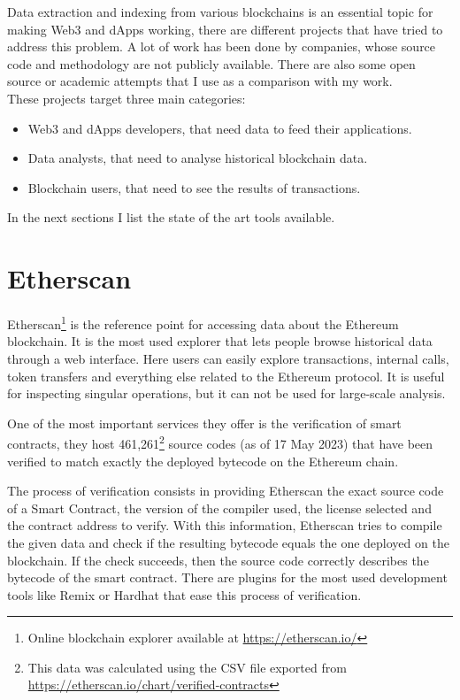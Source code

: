 
Data extraction and indexing from various blockchains is an essential topic for making Web3 and dApps working, there are different projects that have tried to address this problem. A lot of work has been done by companies, whose source code and methodology are not publicly available. There are also some open source or academic attempts that I use as a comparison with my work. \\

\noindent These projects target three main categories:

\begin{itemize}
  \item Web3 and dApps developers, that need data to feed their applications.
  \item Data analysts, that need to analyse historical blockchain data. 
  \item Blockchain users, that need to see the results of transactions.
\end{itemize}

\noindent In the next sections I list the state of the art tools available.

\section{Etherscan}

Etherscan\footnote{Online blockchain explorer available at \url{https://etherscan.io/}} is the reference point for accessing data about the Ethereum blockchain. It is the most used explorer that lets people browse historical data through a web interface. Here users can easily explore transactions, internal calls, token transfers and everything else related to the Ethereum protocol. It is useful for inspecting singular operations, but it can not be used for large-scale analysis.

One of the most important services they offer is the verification of smart contracts, they host 461,261\footnote{This data was calculated using the CSV file exported from \url{https://etherscan.io/chart/verified-contracts}} source codes (as of 17 May 2023) that have been verified to match exactly the deployed bytecode on the Ethereum chain. 

The process of verification consists in providing Etherscan the exact source code of a Smart Contract, the version of the compiler used, the license selected and the contract address to verify. With this information, Etherscan tries to compile the given data and check if the resulting bytecode equals the one deployed on the blockchain. If the check succeeds, then the source code correctly describes the bytecode of the smart contract. There are plugins for the most used development tools like Remix or Hardhat that ease this process of verification.

